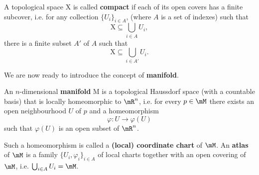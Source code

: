 A topological space $\mathrm{X}$ is called \textbf{compact} if each of its open covers has a finite subcover, i.e. for any collection $\{U_i\}_{i\in A}$, (where $A$ is a set of indexes) such that $$\mathrm{X}\subseteq\bigcup_{i\in A}U_i,$$ there is a finite subset $A'$ of $A$ such that $$ \mathrm{X}\subseteq\bigcup_{i\in A'}U_i.$$

We are now ready to introduce the concept of \textbf{manifold}.
\begin{definition}
	An $n$-dimensional \textbf{manifold} $\mathrm{M}$ is a topological Haussdorf space (with a countable basis) that is locally homeomorphic to $\mR^n$, i.e. for every $p\in\mM$ there exists an open neighbourhood $U$ of $p$ and a homeomorphism $$\varphi:U\to\varphi(U)$$ such that $\varphi(U)$ is an open subset of $\mR^n$.
\end{definition}
	
	Such a homeomorphism is called a \textbf{(local) coordinate chart} of $\mM$. An \textbf{atlas} of $\mM$ is a family $\{U_i,\varphi_i\}_{i\in A}$ of local charts together with an open covering of $\mM$, i.e. $ \bigcup_{i\in A}U_i=\mM$.

